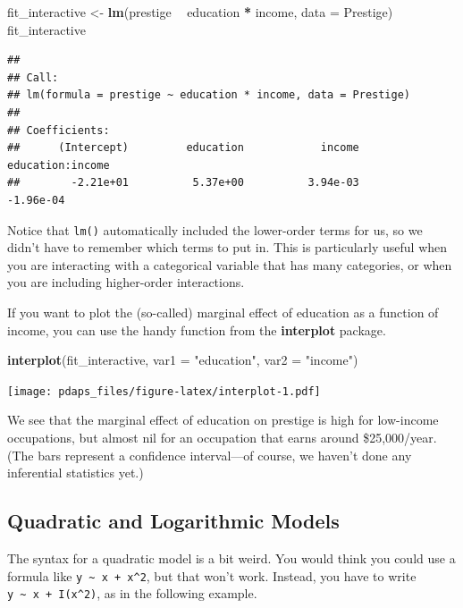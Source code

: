 \documentclass[12pt,oneside,openany]{book}
\newenvironment{Shaded}{\begin{snugshade}}{\end{snugshade}}
\newcommand{\KeywordTok}[1]{\textcolor[rgb]{0.13,0.29,0.53}{\textbf{#1}}}
\newcommand{\DataTypeTok}[1]{\textcolor[rgb]{0.13,0.29,0.53}{#1}}
\newcommand{\StringTok}[1]{\textcolor[rgb]{0.31,0.60,0.02}{#1}}
\newcommand{\OperatorTok}[1]{\textcolor[rgb]{0.81,0.36,0.00}{\textbf{#1}}}
\newcommand{\NormalTok}[1]{#1}
\begin{document}
\begin{Shaded}
\begin{Highlighting}[]
\NormalTok{fit_interactive <-}\StringTok{ }\KeywordTok{lm}\NormalTok{(prestige }\OperatorTok{~}\StringTok{ }\NormalTok{education }\OperatorTok{*}\StringTok{ }\NormalTok{income, }\DataTypeTok{data =}\NormalTok{ Prestige)}
\NormalTok{fit_interactive}
\end{Highlighting}
\end{Shaded}

\begin{verbatim}
## 
## Call:
## lm(formula = prestige ~ education * income, data = Prestige)
## 
## Coefficients:
##      (Intercept)         education            income  education:income  
##        -2.21e+01          5.37e+00          3.94e-03         -1.96e-04
\end{verbatim}

Notice that \texttt{lm()} automatically included the lower-order terms
for us, so we didn't have to remember which terms to put in. This is
particularly useful when you are interacting with a categorical variable
that has many categories, or when you are including higher-order
interactions.

If you want to plot the (so-called) marginal effect of education as a
function of income, you can use the handy function from the
\textbf{interplot} package.

\begin{Shaded}
\begin{Highlighting}[]
\KeywordTok{interplot}\NormalTok{(fit_interactive, }\DataTypeTok{var1 =} \StringTok{"education"}\NormalTok{, }\DataTypeTok{var2 =} \StringTok{"income"}\NormalTok{)}
\end{Highlighting}
\end{Shaded}

\texttt{[image: pdaps\_files/figure-latex/interplot-1.pdf]}

We see that the marginal effect of education on prestige is high for
low-income occupations, but almost nil for an occupation that earns
around \$25,000/year. (The bars represent a confidence interval---of
course, we haven't done any inferential statistics yet.)

\subsection{Quadratic and Logarithmic
Models}\label{quadratic-and-logarithmic-models}

The syntax for a quadratic model is a bit weird. You would think you
could use a formula like \texttt{y\ \textasciitilde{}\ x\ +\ x\^{}2},
but that won't work. Instead, you have to write
\texttt{y\ \textasciitilde{}\ x\ +\ I(x\^{}2)}, as in the following
example.
\end{document}

